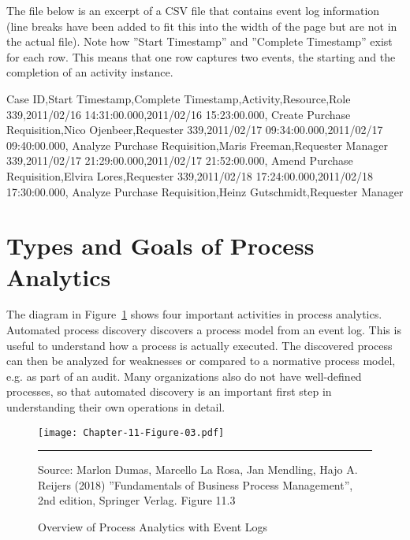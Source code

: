 The file below is an excerpt of a CSV file that contains event log information (line breaks have been added to fit this into the width of the page but are not in the actual file). Note how ''Start Timestamp'' and ''Complete Timestamp'' exist for each row. This means that one row captures two events, the starting and the completion of an activity instance. 

\begin{samepage}
\begin{textcode}
Case ID,Start Timestamp,Complete Timestamp,Activity,Resource,Role
339,2011/02/16 14:31:00.000,2011/02/16 15:23:00.000,
    Create Purchase Requisition,Nico Ojenbeer,Requester
339,2011/02/17 09:34:00.000,2011/02/17 09:40:00.000,
    Analyze Purchase Requisition,Maris Freeman,Requester Manager
339,2011/02/17 21:29:00.000,2011/02/17 21:52:00.000,
    Amend Purchase Requisition,Elvira Lores,Requester
339,2011/02/18 17:24:00.000,2011/02/18 17:30:00.000,
    Analyze Purchase Requisition,Heinz Gutschmidt,Requester Manager
\end{textcode}
\end{samepage}

\section{Types and Goals of Process Analytics}

The diagram in Figure~\ref{fig:processanalytics} shows four important activities in process analytics. Automated process discovery discovers a process model from an event log. This is useful to understand how a process is actually executed. The discovered process can then be analyzed for weaknesses or compared to a normative process model, e.g. as part of an audit. Many organizations also do not have well-defined processes, so that automated discovery is an important first step in understanding their own operations in detail.

\begin{figure}
\centering
\texttt{[image: Chapter-11-Figure-03.pdf]}\\
\vspace{3mm}\hrule\vspace{2mm}
\scriptsize{Source: Marlon Dumas, Marcello La Rosa, Jan Mendling, Hajo A. Reijers (2018) ''Fundamentals of Business Process Management'', 2nd edition, Springer Verlag. Figure 11.3}
\caption{Overview of Process Analytics with Event Logs}
\label{fig:processanalytics}
\end{figure}

